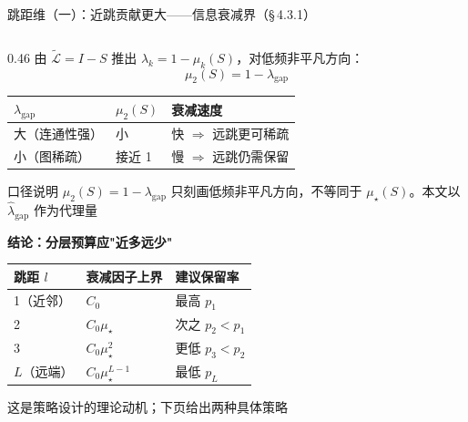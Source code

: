 \documentclass[aspectratio=169,9pt,xcolor=dvipsnames]{beamer}
\newcommand{\blue}[1]{\textcolor{mynavy}{#1}}
\begin{document}
\begin{frame}{跳距维（一）：近跳贡献更大——信息衰减界（§\,4.3.1）}
\begin{columns}[T]
\begin{column}{0.46\textwidth}
  由 $\tilde{\mathcal{L}}=I-S$ 推出 $\lambda_k=1-\mu_k(S)$，对低频非平凡方向：
  \begin{equation*}
    \mu_2(S)=1-\lambda_{\mathrm{gap}}
  \end{equation*}

  \vspace{0.03cm}
  
  \begin{tabular}{lll}
    \toprule
    $\lambda_{\mathrm{gap}}$ & $\mu_2(S)$ & 衰减速度 \\
    \midrule
    大（连通性强） & 小 & 快 $\Rightarrow$ 远跳更可稀疏 \\
    小（图稀疏） & 接近 1 & 慢 $\Rightarrow$ 远跳仍需保留 \\
    \bottomrule
  \end{tabular}

  \vspace{0.05cm}
  \begin{alertblock}{口径说明}
     $\mu_2(S)=1-\lambda_{\mathrm{gap}}$ 只刻画低频非平凡方向，不等同于 $\mu_\star(S)$。本文以 $\hat{\lambda}_{\mathrm{gap}}$ 作为代理量
  \end{alertblock}

  \vspace{0.08cm}
  \textbf{\blue{结论：分层预算应"近多远少"}}

  \vspace{0.03cm}
  \begin{tabular}{lll}
    \toprule
    跳距 $l$ & 衰减因子上界 & 建议保留率 \\
    \midrule
    1（近邻） & $C_0$ & 最高 $p_1$ \\
    2 & $C_0\mu_\star$ & 次之 $p_2 < p_1$ \\
    3 & $C_0\mu_\star^2$ & 更低 $p_3 < p_2$ \\
    $L$（远端） & $C_0\mu_\star^{L-1}$ & 最低 $p_L$ \\
    \bottomrule
  \end{tabular}

  \vspace{0.05cm}
  \footnotesize 这是策略设计的理论动机；下页给出两种具体策略
\end{column}
\end{columns}
\end{frame}
\end{document}
